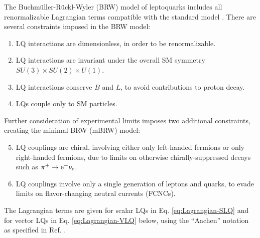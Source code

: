 The Buchm\"{u}ller-R\"{u}ckl-Wyler (BRW) model of leptoquarks includes all renormalizable Lagrangian terms compatible with the standard model \cite{BRW,BRWerr}. There are several constraints imposed in the BRW model:
\begin{enumerate}
\item LQ interactions are dimensionless, in order to be renormalizable.
\item LQ interactions are invariant under the overall SM symmetry $SU(3) \times SU(2) \times U(1)$.
\item LQ interactions conserve $B$ and $L$, to avoid contributions to proton decay.
\item LQs couple only to SM particles.
\end{enumerate}
Further consideration of experimental limits imposes two additional constraints, creating the minimal BRW (mBRW) model:
\begin{enumerate}
\setcounter{enumi}{4}
\item LQ couplings are chiral, involving either only left-handed fermions or only right-handed fermions, due to limits on otherwise chirally-suppressed decays such as $\pi^{+} \rightarrow \mathrm{e}^{+} \nu_{\mathrm{e}}$.
\item LQ couplings involve only a single generation of leptons and quarks, to evade limits on flavor-changing neutral currents (FCNCs).
\end{enumerate}
The Lagrangian terms are given for scalar LQs in Eq. \eqref{eq:Lagrangian-SLQ} and for vector LQs in Eq. \eqref{eq:Lagrangian-VLQ} below, using the ``Aachen'' notation as specified in Ref. \cite{ModelIndLQ}.
